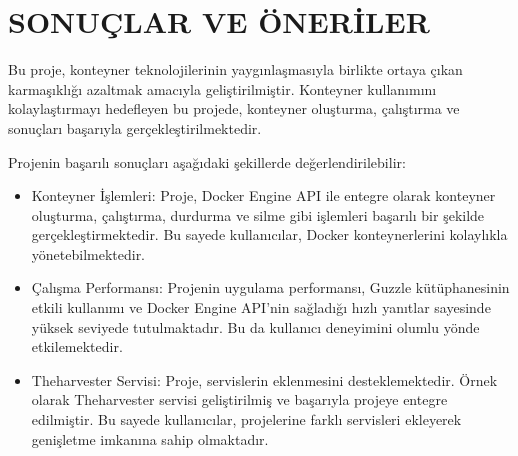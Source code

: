\section{SONUÇLAR VE ÖNERİLER}

Bu proje, konteyner teknolojilerinin yaygınlaşmasıyla birlikte ortaya çıkan karmaşıklığı azaltmak amacıyla geliştirilmiştir. Konteyner kullanımını kolaylaştırmayı hedefleyen bu projede, konteyner oluşturma, çalıştırma ve sonuçları başarıyla gerçekleştirilmektedir. 

Projenin başarılı sonuçları aşağıdaki şekillerde değerlendirilebilir:
\begin{itemize}
    \item Konteyner İşlemleri: Proje, Docker Engine API ile entegre olarak konteyner oluşturma, çalıştırma, durdurma ve silme gibi işlemleri başarılı bir şekilde gerçekleştirmektedir. Bu sayede kullanıcılar, Docker konteynerlerini kolaylıkla yönetebilmektedir.
    \item Çalışma Performansı: Projenin uygulama performansı, Guzzle kütüphanesinin etkili kullanımı ve Docker Engine API'nin sağladığı hızlı yanıtlar sayesinde yüksek seviyede tutulmaktadır. Bu da kullanıcı deneyimini olumlu yönde etkilemektedir.
    \item Theharvester Servisi: Proje, servislerin eklenmesini desteklemektedir. Örnek olarak Theharvester servisi geliştirilmiş ve başarıyla projeye entegre edilmiştir. Bu sayede kullanıcılar, projelerine farklı servisleri ekleyerek genişletme imkanına sahip olmaktadır.
\end{itemize}




